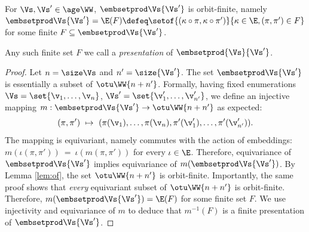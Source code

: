 \begin{lemma} \label{lem:embsetprod}
For $\Vs, \Vs'\in\age \WW$,  $\embsetprod \Vs  {\Vs'}$ is orbit-finite, namely
$\embsetprod \Vs  {\Vs'} = \E(F) \defeq \setof{(\kappa\circ\pi,\kappa\circ\pi')}{\kappa\in\E, (\pi, \pi')\in F}$ for some finite  $F\subseteq \embsetprod \Vs {\Vs'}$.
\end{lemma}
%
Any such finite set $F$ we call a \emph{presentation} of  $\embsetprod {\Vs}{\Vs'}$.
%
\begin{proof}
%
%
%
Let $n=\size \Vs$ and $n' = \size{\Vs'}$.
The set $\embsetprod \Vs {\Vs'}$ is essentially a subset of $\otu \WW {n+n'}$.
Formally, having fixed enumerations $\Vs = \set{\v_1, \ldots, \v_n}$,
$\Vs' = \set{\v'_1, \ldots, \v'_{n'}}$, we define an injective mapping
$
m : \embsetprod \Vs {\Vs'} \to \otu \WW {n+n'}
$ as expected:
\[
(\pi, \pi') \ \mapsto \ (\pi(\v_1), \ldots, \pi(\v_n), \pi'(\v'_1), \ldots, \pi'(\v'_{n'})).
\]
The mapping is equivariant, namely commutes with the action of embeddings:
$
m(\iota(\pi, \pi')) \ = \ \iota(m(\pi, \pi')) 
$
for every $\iota\in\E$.
Therefore, equivariance of $\embsetprod \Vs {\Vs'}$ implies equivariance of
$m(\embsetprod \Vs {\Vs'})$. 
By Lemma \ref{lem:of}, the set $\otu \WW {n+n'}$ is orbit-finite.
Importantly, the same proof shows that \emph{every} equivariant subset of $\otu \WW {n+n'}$ is orbit-finite.
Therefore, $m(\embsetprod \Vs {\Vs'}) = \E(F)$ for some finite set $F$.
We use injectivity and equivariance of $m$ to deduce that $m^{-1}(F)$ is a finite presentation of
$\embsetprod \Vs {\Vs'}$.
\end{proof}
%
%

